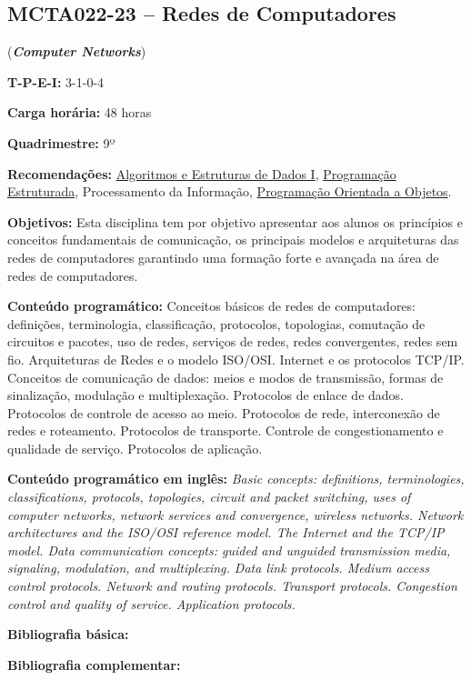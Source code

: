 \documentclass[class=article, crop=false]{standalone}
\begin{document}
\subsection{MCTA022-23 -- Redes de Computadores}
\label{disc:redes}

(\textbf{\textit{Computer Networks}})

\begin{center}
    \begin{minipage}{0.85\textwidth}
        \textbf{T-P-E-I:} 3-1-0-4
        
        \textbf{Carga horária:} 48 horas
        
        \textbf{Quadrimestre:} 9º
        
        \textbf{Recomendações:} 
        \hyperref[disc:aedI]{Algoritmos e Estruturas de Dados I},
        \hyperref[disc:pe]{Programação Estruturada},
        Processamento da Informação, 
        \hyperref[disc:poo]{Programação Orientada a Objetos}.
    \end{minipage}
\end{center}

\textbf{Objetivos:}
Esta disciplina tem por objetivo apresentar aos alunos os princípios e
conceitos fundamentais de comunicação, os principais modelos e arquiteturas das
redes de computadores garantindo uma formação forte e avançada na área de redes
de computadores. 

\textbf{Conteúdo programático:}
Conceitos básicos de redes de computadores: definições, terminologia,
classificação, protocolos, topologias, comutação de circuitos e pacotes, uso de
redes, serviços de redes, redes convergentes, redes sem fio. 
Arquiteturas de Redes e o modelo ISO/OSI. 
Internet e os protocolos TCP/IP. 
Conceitos de comunicação de dados: meios e modos de transmissão, formas de
sinalização, modulação e multiplexação. 
Protocolos de enlace de dados. 
Protocolos de controle de acesso ao meio. 
Protocolos de rede, interconexão de redes e roteamento. 
Protocolos de transporte. 
Controle de congestionamento e qualidade de serviço. 
Protocolos de aplicação. 

\textbf{Conteúdo programático em inglês:}
\textit{Basic concepts: definitions, terminologies, classifications, protocols, topologies, circuit and packet switching, uses of computer networks, network services and convergence, wireless networks.
Network architectures and the ISO/OSI reference model. 
The Internet and the TCP/IP model. 
Data communication concepts: guided and unguided transmission media, signaling, modulation, and multiplexing. 
Data link protocols. 
Medium access control protocols. 
Network and routing protocols. 
Transport protocols. 
Congestion control and quality of service. 
Application protocols.}

\newrefsection
\textbf{Bibliografia básica:}
\nocite{2003-tanenbaum, 2008-fourozan, 2010-kurose}
\printbibliography

\newrefsection
\textbf{Bibliografia complementar:}
\nocite{2005-halsall, 2007-comer, 2005-stallings, 2007-peterson, 2011-souza}
\printbibliography
\end{document}
